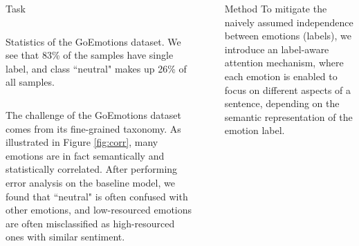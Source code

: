\documentclass[final,20pt]{beamer}
\newlength{\sepwid}
\newlength{\onecolwid}
\begin{document}
\begin{frame}[t]
\begin{columns}[t]
\begin{column}{\onecolwid}
\begin{block}{Task}
\begin{columns}
\begin{column}{0.4\linewidth}
\begin{table}
    \caption{Statistics of the GoEmotions dataset. We see that 83\% of the samples have single label, and class ``neutral" makes up 26\% of all samples.}
    \label{fig:my_label}
\end{table}
\end{column}
\end{columns}
\vspace{1ex}

The challenge of the GoEmotions dataset comes from its fine-grained taxonomy. As illustrated in Figure \ref{fig:corr}, many emotions are in fact semantically and statistically correlated. After performing error analysis on the baseline model, we found that ``neutral" is often confused with other emotions, and low-resourced emotions are often misclassified as high-resourced ones with similar sentiment. 



\end{block}



\end{column} %

\begin{column}{\sepwid}\end{column} %

\begin{column}{\onecolwid} 
\vspace*{-0.5in}
\begin{block}{Method}
To mitigate the naively assumed independence between emotions (labels), we introduce an label-aware attention mechanism, where each emotion is enabled to focus on different aspects of a sentence, depending on the semantic representation of the emotion label. 

\begin{figure}
\begin{center}


\end{center}
\end{figure}
\end{block}
\end{column}
\end{columns}
\end{frame}
\end{document}

